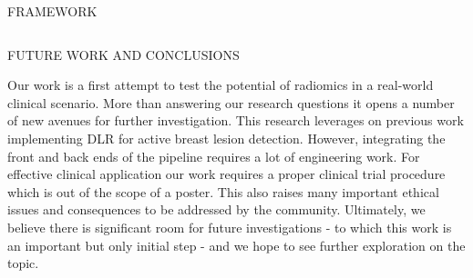 \documentclass[final]{beamer}
\begin{document}
\begin{frame}[t, fragile = singleslide]{}
\begin{columns}[t]
\begin{column}{0.945\textwidth}
\begin{block}{FRAMEWORK}
\end{block}

\end{column}

\end{columns}

\hfill

\begin{columns}[t]

\begin{column}{0.45\textwidth}

\begin{block}{FUTURE WORK AND CONCLUSIONS}

Our work is a first attempt to test the potential of radiomics in a real-world clinical scenario. More than answering our research questions it opens a number of new avenues for further investigation. This research leverages on previous work implementing DLR for active breast lesion detection. However, integrating the front and back ends of the pipeline requires a lot of engineering work. For effective clinical application our work requires a proper clinical trial procedure which is out of the scope of a poster. This also raises many important ethical issues and consequences to be addressed by the community. Ultimately, we believe there is significant room for future investigations - to which this work is an important but only initial step - and we hope to see further exploration on the topic.

\end{block}


\end{column}
\end{columns}
\end{frame}
\end{document}
